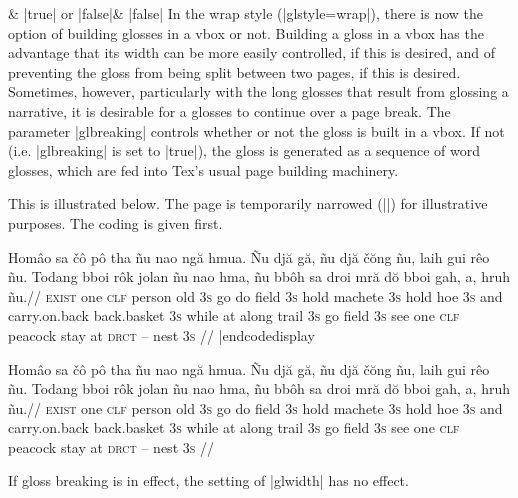 \begininventory
\parameters*
{}& |true| or |false|& |false|\cr
\endinventory
In the wrap style (|glstyle=wrap|), there is now the option of
building glosses in a vbox or not.  Building a gloss in a vbox has the
advantage that its width can be more easily controlled, if this is
desired, and of preventing the gloss from being split between two
pages, if this is desired.  Sometimes, however, particularly with the
long glosses that result from glossing a narrative, it is desirable
for a glosses to continue over a page break.  The parameter
|glbreaking| controls whether or not the gloss is built in a vbox.  If
not (i.e. |glbreaking| is set to |true|), the gloss is generated as a
sequence of word glosses, which are fed into Tex's usual page building
machinery.

This is illustrated below.  The page is temporarily narrowed
(|\hsize=2.5in|) for illustrative purposes.  The coding is given
first.


\codedisplay
\ex
\hsize=2.5in
\let\\=\textsc
\begingl[glhangindent=0pt,glbreaking=true]
\gla Hom\^{a}o sa \v{c}\^{o} p\^{o} tha  \~{n}u nao ng\u{a}
hmua. \~{N}u dj\u{a} g\u{a}, \~{n}u dj\u{a} \v{c}\u{o}ng \~{n}u,
laih gui r\^{e}o \~{n}u. Todang bboi r\^{o}k jolan \~{n}u nao
hma, \~{n}u bb\^{o}h sa droi mr\u{a} d\u{o} bboi gah, a, hruh
\~{n}u.//
\glb \\{exist} one \\{clf} person old \\{3s} go do field
\\{3s} hold machete \\{3s} hold hoe \\{3s} and carry.on.back
back.basket \\{3s} while at along trail \\{3s} go field \\{3s}
see one \\{clf} peacock stay at \\{drct} -- nest \\{3s}
//
\endgl
\xe
|endcodedisplay

\ex
\hsize=2.5in
\let\\=\textsc
\begingl[glhangstyle=none]
\gla Hom\^{a}o sa \v{c}\^{o} p\^{o} tha  \~{n}u nao ng\u{a}
hmua. \~{N}u dj\u{a} g\u{a}, \~{n}u dj\u{a} \v{c}\u{o}ng \~{n}u,
laih gui r\^{e}o \~{n}u. Todang bboi r\^{o}k jolan \~{n}u nao
hma, \~{n}u bb\^{o}h sa droi mr\u{a} d\u{o} bboi gah, a, hruh
\~{n}u.//
\glb \\{exist} one \\{clf} person old \\{3s} go do field
\\{3s} hold machete \\{3s} hold hoe \\{3s} and carry.on.back
back.basket \\{3s} while at along trail \\{3s} go field \\{3s}
see one \\{clf} peacock stay at \\{drct} -- nest \\{3s}
//
\endgl
\xe


If gloss breaking is in effect, the setting of |glwidth| has no
effect.



